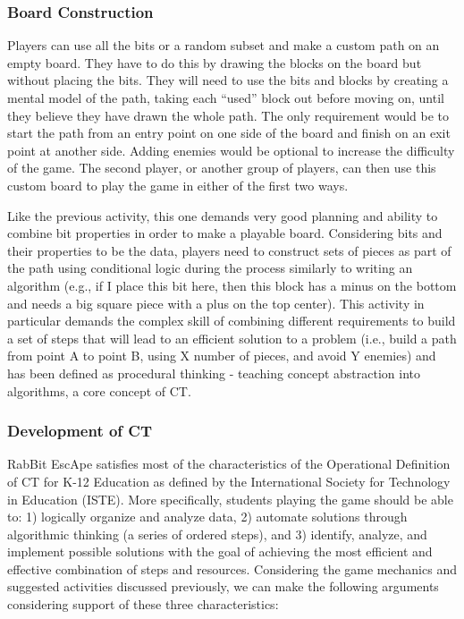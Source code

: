 \documentclass{acm_proc_article-sp}
\begin{document}
\subsubsection{Board Construction}
Players can use all the bits or a random subset and make a custom path on an empty board. They have to do this by drawing the blocks on the board but without placing the bits. They will need to use the bits and blocks by creating a mental model of the path, taking each ``used'' block out before moving on, until they believe they have drawn the whole path. The only requirement would be to start the path from an entry point on one side of the board and finish on an exit point at another side. Adding enemies would be optional to increase the difficulty of the game. The second player, or another group of players, can then use this custom board to play the game in either of the first two ways.

Like the previous activity, this one demands very good planning and ability to combine bit properties in order to make a playable board. Considering bits and their properties to be the data, players need to construct sets of pieces as part of the path using conditional logic during the process similarly to writing an algorithm (e.g., if I place this bit here, then this block has a minus on the bottom and needs a big square piece with a plus on the top center). This activity in particular demands the complex skill of combining different requirements to build a set of steps that will lead to an efficient solution to a problem (i.e., build a path from point A to point B, using X number of pieces, and avoid Y enemies) and has been defined as procedural thinking - teaching concept abstraction into algorithms\cite{papert1980mindstorms}, a core concept of CT\cite{national2010report}.

\subsubsection{Development of CT}

RabBit EscApe satisfies most of the characteristics of the Operational Definition of CT for K-12 Education as defined by the International Society for Technology in Education (ISTE)\cite{operationalct}. 
More specifically, students playing the game should be able to: 1) logically organize and analyze data, 2) automate solutions through algorithmic thinking (a series of ordered steps), and 3) identify, analyze, and implement possible solutions with the goal of achieving the most efficient and effective combination of steps and resources. 
Considering the game mechanics and suggested activities discussed previously, we can make the following arguments considering support of these three characteristics:
\end{document}
